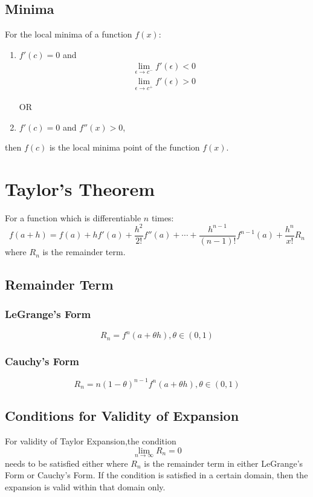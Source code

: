 \documentclass[openany, oneside]{book}
\begin{document}
\subsection{Minima}
For the local minima of a function $f(x)$:
\begin{enumerate}
\item $f'(c)=0$ and
\begin{align}
\lim_{\epsilon\to c^{-}} f'(\epsilon)<0\nonumber\\
\lim_{\epsilon\to c^{+}} f'(\epsilon)>0\nonumber
\end{align}
\begin{center}
OR
\end{center}
\item $f'(c)=0$ and $f''(x)>0$,
\end{enumerate}
then $f(c)$ is the local minima point of the function $f(x)$.

\section{Taylor's Theorem}
For a function which is differentiable $n$ times:
\begin{equation}
f(a+h)=f(a)+hf'(a)+\dfrac{h^2}{2!}f''(a)+\cdots+\dfrac{h^{n-1}}{(n-1)!} f^{n-1}(a)+\dfrac{h^n}{x!}R_n
\end{equation}
where $R_n$ is the remainder term.
\subsection{Remainder Term}
\subsubsection{LeGrange's Form}
\begin{equation}
R_n=f^n (a+\theta h), \theta \in (0,1)
\end{equation}
\subsubsection{Cauchy's Form}
\begin{equation}
R_n=n(1-\theta)^{n-1}f^n(a+\theta h), \theta \in (0,1)
\end{equation}

\subsection{Conditions for Validity of Expansion}
For validity of Taylor Expansion,the condition
\begin{equation}
\lim_{n\to\infty} R_n=0
\end{equation}
needs to be satisfied either where $R_n$ is the remainder term in either LeGrange's Form or Cauchy's Form. If the condition is satisfied in a certain domain, then the expansion is valid within that domain only.
\end{document}

